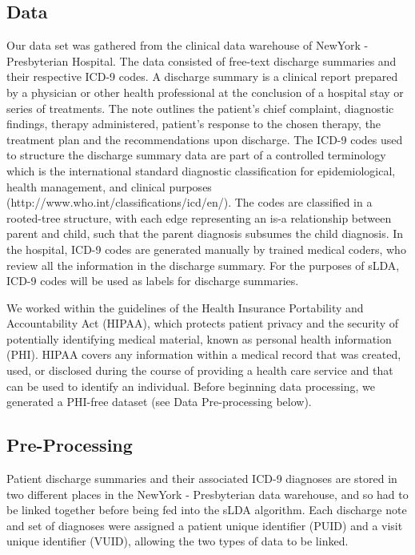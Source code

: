 \documentclass{article}
\begin{document}
\subsection{Data}
Our data set was gathered from the clinical data warehouse of NewYork - Presbyterian Hospital. The data consisted of free-text discharge summaries and their respective ICD-9 codes. A discharge summary is a clinical report prepared by a physician or other health professional at the conclusion of a hospital stay or series of treatments. The note outlines the patient’s chief complaint, diagnostic findings, therapy administered, patient’s response to the chosen therapy, the treatment plan and the recommendations upon discharge. The ICD-9 codes used to structure the discharge summary data are part of a controlled terminology which is the international standard diagnostic classification for epidemiological, health management, and clinical purposes (http://www.who.int/classifications/icd/en/). The codes are classified in a rooted-tree structure, with each edge representing an is-a relationship between parent and child, such that the parent diagnosis subsumes the child diagnosis.  In the hospital, ICD-9 codes are generated manually by trained medical coders, who review all the information in the discharge summary.  For the purposes of sLDA, ICD-9 codes will be used as labels for discharge summaries.

We worked within the guidelines of the Health Insurance Portability and Accountability Act (HIPAA), which protects patient privacy and the security of potentially identifying medical material, known as personal health information (PHI).  HIPAA covers any information within a medical record that was created, used, or disclosed during the course of providing a health care service and that can be used to identify an individual.  Before beginning data processing, we generated a PHI-free dataset (see Data Pre-processing below).

\subsection{Pre-Processing}
Patient discharge summaries and their associated ICD-9 diagnoses are stored in two different places in the NewYork - Presbyterian data warehouse, and so had to be linked together before being fed into the sLDA algorithm.  Each discharge note and set of diagnoses were assigned a patient unique identifier (PUID) and a visit unique identifier (VUID), allowing the two types of data to be linked.
\end{document}
